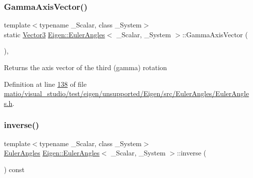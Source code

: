 \subsubsection{\texorpdfstring{Gamma\+Axis\+Vector()}{GammaAxisVector()}\hspace{0.1cm}{\footnotesize\ttfamily [2/2]}}
{\footnotesize\ttfamily template$<$typename \+\_\+\+Scalar, class \+\_\+\+System$>$ \\
static \hyperlink{class_eigen_1_1_euler_angles_af0f446aa0f46b3439abedff63fabf39c}{Vector3} \hyperlink{class_eigen_1_1_euler_angles}{Eigen\+::\+Euler\+Angles}$<$ \+\_\+\+Scalar, \+\_\+\+System $>$\+::Gamma\+Axis\+Vector (\begin{DoxyParamCaption}{ }\end{DoxyParamCaption})\hspace{0.3cm}{\ttfamily [inline]}, {\ttfamily [static]}}

\begin{DoxyReturn}{Returns}
the axis vector of the third (gamma) rotation 
\end{DoxyReturn}


Definition at line \hyperlink{matio_2visual__studio_2test_2eigen_2unsupported_2_eigen_2src_2_euler_angles_2_euler_angles_8h_source_l00138}{138} of file \hyperlink{matio_2visual__studio_2test_2eigen_2unsupported_2_eigen_2src_2_euler_angles_2_euler_angles_8h_source}{matio/visual\+\_\+studio/test/eigen/unsupported/\+Eigen/src/\+Euler\+Angles/\+Euler\+Angles.\+h}.

\mbox{\label{class_eigen_1_1_euler_angles_a1c37cedc590311d6ecaec7215d7c8f2c}} 
\subsubsection{\texorpdfstring{inverse()}{inverse()}\hspace{0.1cm}{\footnotesize\ttfamily [1/2]}}
{\footnotesize\ttfamily template$<$typename \+\_\+\+Scalar, class \+\_\+\+System$>$ \\
\hyperlink{class_eigen_1_1_euler_angles}{Euler\+Angles} \hyperlink{class_eigen_1_1_euler_angles}{Eigen\+::\+Euler\+Angles}$<$ \+\_\+\+Scalar, \+\_\+\+System $>$\+::inverse (\begin{DoxyParamCaption}{ }\end{DoxyParamCaption}) const\hspace{0.3cm}{\ttfamily [inline]}}

